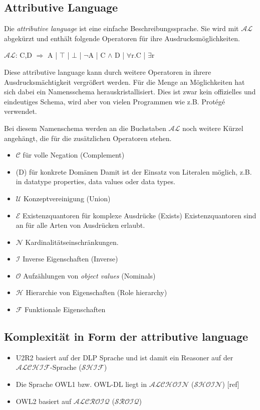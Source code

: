 \subsection{Attributive Language}
Die \emph{attributive language} ist eine einfache Beschreibungssprache. Sie wird mit $\mathcal{AL}$ abgekürzt und enthält folgende Operatoren für ihre Ausdrucksmöglichkeiten.

$\mathcal{AL}$: C,D $\Longrightarrow$ A | $\top$ | $\bot$ | $\lnot$A | C $\land$ D | $\forall$r.C | $\exists$r

Diese attributive language kann durch weitere Operatoren in ihrere Ausdrucksmächtigkeit vergrößert werden. Für die Menge an Möglichkeiten hat sich dabei ein Namensschema herauskristallisiert. Dies ist zwar kein offizielles und eindeutiges Schema, wird aber von vielen Programmen wie z.B. Protégé verwendet.

Bei diesem Namenschema werden an die Buchstaben $\mathcal{AL}$ noch weitere Kürzel angehängt, die für die zusätzlichen Operatoren stehen.
\begin{itemize}
  \item $\mathcal{C}$ für volle Negation (Complement)
  \item (D) für konkrete Domänen\newline
Damit ist der Einsatz von Literalen möglich, z.B. in datatype properties, data values oder data types.
  \item $\mathcal{U}$ Konzeptvereinigung (Union)
  \item $\mathcal{E}$ Existenzquantoren für komplexe Ausdrücke (Exists)\newline
Existenzquantoren sind an für alle Arten von Ausdrücken erlaubt.
  \item $\mathcal{N}$ Kardinalitätseinschränkungen.
  \item $\mathcal{I}$ Inverse Eigenschaften (Inverse)
  \item $\mathcal{O}$ Aufzählungen von \emph{object values} (Nominals)
  \item $\mathcal{H}$ Hierarchie von Eigenschaften (Role hierarchy)
  \item $\mathcal{F}$ Funktionale Eigenschaften
\end{itemize}
\cite{wiki:DescriptionLogic}

\subsection{Komplexität in Form der attributive language}
\begin{itemize}
  \item U2R2 basiert auf der DLP Sprache und ist damit ein Reasoner auf der $\mathcal{ALCHIF}$-Sprache ($\mathcal{SHIF}$)
  \item Die Sprache OWL1 bzw. OWL-DL liegt in $\mathcal{ALCHOIN}$ ($\mathcal{SHOIN}$) [ref]
  \item OWL2 basiert auf $\mathcal{ALCROIQ}$ ($\mathcal{SROIQ}$) \cite{Krötzsch2008}
\end{itemize}


